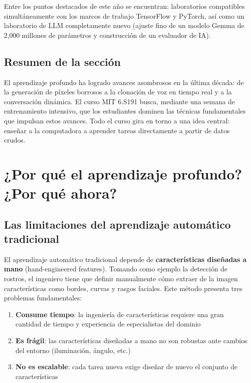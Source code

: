 \documentclass[a4paper]{article}
\begin{document}
Entre los puntos destacados de este año se encuentran: laboratorios compatibles simultáneamente con los marcos de trabajo TensorFlow y PyTorch, así como un laboratorio de LLM completamente nuevo (ajuste fino de un modelo Gemma de 2,000 millones de parámetros y construcción de un evaluador de IA).

\subsection{Resumen de la sección}

El aprendizaje profundo ha logrado avances asombrosos en la última década: de la generación de píxeles borrosos a la clonación de voz en tiempo real y a la conversación dinámica. El curso MIT 6.S191 busca, mediante una semana de entrenamiento intensivo, que los estudiantes dominen las técnicas fundamentales que impulsan estos avances. Todo el curso gira en torno a una idea central: enseñar a la computadora a aprender tareas directamente a partir de datos crudos.
\section{¿Por qué el aprendizaje profundo? ¿Por qué ahora?}

\subsection{Las limitaciones del aprendizaje automático tradicional}

El aprendizaje automático tradicional depende de \textbf{características diseñadas a mano} (hand-engineered features). Tomando como ejemplo la detección de rostros, el ingeniero tiene que definir manualmente cómo extraer de la imagen características como bordes, curvas y rasgos faciales. Este método presenta tres problemas fundamentales:

\begin{enumerate}
\item \textbf{Consume tiempo}: la ingeniería de características requiere una gran cantidad de tiempo y experiencia de especialistas del dominio
\item \textbf{Es frágil}: las características diseñadas a mano no son robustas ante cambios del entorno (iluminación, ángulo, etc.)
\item \textbf{No es escalable}: cada tarea nueva exige diseñar de nuevo el conjunto de características
\end{enumerate}
\end{document}
